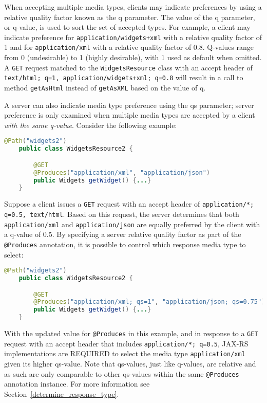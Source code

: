 When accepting multiple media types, clients may indicate preferences by using a relative quality factor known as the q
parameter. The value of the q parameter, or q-value, is used to sort the set of accepted types. For example, a client
may indicate preference for \lstinline{application/widgets+xml} with a relative quality factor of 1 and for
\lstinline{application/xml} with a relative quality factor of 0.8. Q-values range from 0 (undesirable) to 1
(highly desirable), with 1 used as default when omitted. A \lstinline{GET} request matched to the
\lstinline{WidgetsResource} class with an accept header of \lstinline{text/html; q=1, application/widgets+xml; q=0.8}
will result in a call to method \lstinline{getAsHtml} instead of \lstinline{getAsXML} based on the value of q.

A server can also indicate media type preference using the qs parameter; server preference is only examined when
multiple media types are accepted by a client {\em with the same q-value}. Consider the following example:

\begin{lstlisting}[language=Java]
    @Path("widgets2")
    public class WidgetsResource2 {

        @GET
        @Produces("application/xml", "application/json")
        public Widgets getWidget() {...}
    }
\end{lstlisting}

Suppose a client issues a \lstinline{GET} request with an accept header of \lstinline{application/*; q=0.5, text/html}.
Based on this request, the server determines that both \lstinline{application/xml} and \lstinline{application/json} are
equally preferred by the client with a q-value of 0.5. By specifying a server relative quality factor as part of the
\lstinline{@Produces} annotation, it is possible to control which response media type to select:

\begin{lstlisting}[language=Java]
    @Path("widgets2")
    public class WidgetsResource2 {

        @GET
        @Produces("application/xml; qs=1", "application/json; qs=0.75")
        public Widgets getWidget() {...}
    }
\end{lstlisting}

With the updated value for \lstinline{@Produces} in this example, and in response to a \lstinline{GET} request with an
accept header that includes \lstinline{application/*; q=0.5}, JAX-RS implementations are REQUIRED to select the media
type \lstinline{application/xml} given its higher qs-value. Note that qs-values, just like q-values, are relative and as
such are only comparable to other qs-values within the same \lstinline{@Produces} annotation instance. For more
information see Section~\ref{determine_response_type}.

